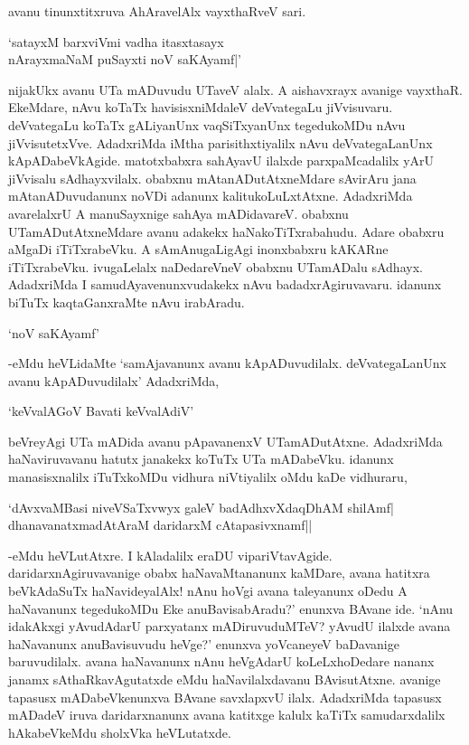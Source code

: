 avanu tinunxtitxruva AhAravelAlx vayxthaRveV sari.

\begin{shloka}
`satayxM barxviVmi vadha itasxtasayx\\
nArayxmaNaM puSayxti noV saKAyamf|'
\end{shloka}

nijakUkx avanu UTa mADuvudu UTaveV alalx. A aishavxrayx avanige vayxthaR. EkeMdare, nAvu koTaTx havisisxniMdaleV deVvategaLu jiVvisuvaru. deVvategaLu koTaTx gALiyanUnx vaqSiTxyanUnx tegedukoMDu nAvu jiVvisutetxVve. AdadxriMda iMtha parisithxtiyalilx nAvu deVvategaLanUnx kApADabeVkAgide. matotxbabxra sahAyavU ilalxde parxpaMcadalilx yArU jiVvisalu sAdhayxvilalx. obabxnu mAtanADutAtxneMdare sAvirAru jana mAtanADuvudanunx noVDi adanunx kalitukoLuLxtAtxne. AdadxriMda avarelalxrU A manuSayxnige sahAya mADidavareV. obabxnu UTamADutAtxneMdare avanu adakekx haNakoTiTxrabahudu. Adare obabxru aMgaDi iTiTxrabeVku. A sAmAnugaLigAgi inonxbabxru kAKARne iTiTxrabeVku. ivugaLelalx naDedareVneV obabxnu UTamADalu sAdhayx. AdadxriMda I samudAyavenunxvudakekx nAvu badadxrAgiruvavaru. idanunx biTuTx kaqtaGanxraMte nAvu irabAradu.

\begin{shloka}
`noV saKAyamf'
\end{shloka}

-eMdu heVLidaMte `samAjavanunx avanu kApADuvudilalx. deVvategaLanUnx avanu kApADuvudilalx' AdadxriMda,

\begin{shloka}
`keVvalAGoV Bavati keVvalAdiV'
\end{shloka}

beVreyAgi UTa mADida avanu pApavanenxV UTamADutAtxne. AdadxriMda haNaviruvavanu hatutx janakekx koTuTx UTa mADabeVku. idanunx manasisxnalilx iTuTxkoMDu vidhura niVtiyalilx oMdu kaDe vidhuraru,

\begin{shloka}
`dAvxvaMBasi niveVSaTxvwyx galeV badAdhxvXdaqDhAM shilAmf|\\
dhanavanatxmadAtAraM daridarxM cAtapasivxnamf||
\end{shloka}

-eMdu heVLutAtxre. I kAladalilx eraDU vipariVtavAgide. daridarxnAgiruvavanige obabx haNavaMtananunx kaMDare, avana hatitxra beVkAdaSuTx haNavideyalAlx! nAnu hoVgi avana taleyanunx oDedu A haNavanunx tegedukoMDu Eke anuBavisabAradu?' enunxva BAvane ide. `nAnu idakAkxgi yAvudAdarU parxyatanx mADiruvuduMTeV? yAvudU ilalxde avana haNavanunx anuBavisuvudu heVge?' enunxva yoVcaneyeV baDavanige baruvudilalx. avana haNavanunx nAnu heVgAdarU koLeLxhoDedare nananx janamx sAthaRkavAgutatxde eMdu haNavilalxdavanu BAvisutAtxne. avanige tapasusx mADabeVkenunxva BAvane savxlapxvU ilalx. AdadxriMda tapasusx mADadeV iruva daridarxnanunx avana katitxge kalulx kaTiTx samudarxdalilx hAkabeVkeMdu sholxVka heVLutatxde.

